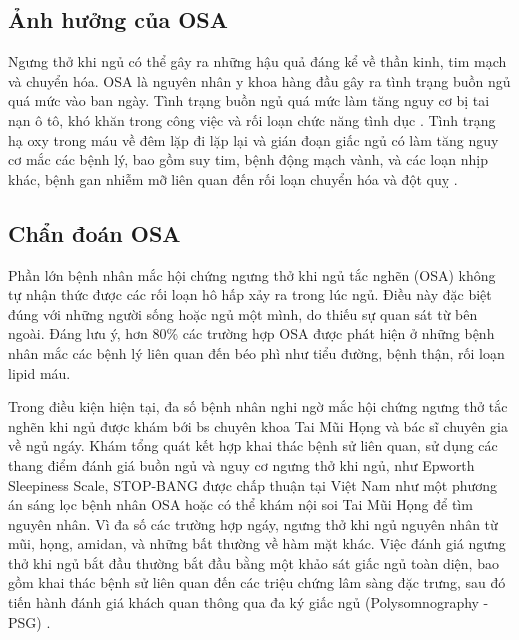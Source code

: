 \subsection{Ảnh hưởng của OSA}
Ngưng thở khi ngủ có thể gây ra những hậu quả đáng kể về thần kinh, tim mạch và
chuyển hóa. OSA là nguyên nhân y khoa hàng đầu gây ra tình trạng buồn ngủ quá
mức vào ban ngày. Tình trạng buồn ngủ quá mức làm tăng nguy cơ bị tai nạn ô tô,
khó khăn trong công việc và rối loạn chức năng tình dục
\cite{flemons1997quality}. Tình trạng hạ oxy trong máu về đêm lặp đi lặp lại và
gián đoạn giấc ngủ có làm tăng nguy cơ mắc các bệnh lý, bao gồm suy tim, bệnh
động mạch vành, và các loạn nhịp khác, bệnh gan nhiễm mỡ liên quan đến rối loạn
chuyển hóa và đột quỵ \cite{ wright1997health,Zinchuk2018,
  young1997population}.
\subsection{Chẩn đoán OSA}
Phần lớn bệnh nhân mắc hội chứng ngưng thở khi ngủ tắc nghẽn (\gls{OSA}) không
tự nhận thức được các rối loạn hô hấp xảy ra trong lúc ngủ. Điều này đặc biệt
đúng với những người sống hoặc ngủ một mình, do thiếu sự quan sát từ bên ngoài.
Đáng lưu ý, hơn 80\% các trường hợp OSA được phát hiện ở những bệnh nhân mắc
các bệnh lý liên quan đến béo phì như tiểu đường, bệnh thận, rối loạn lipid
máu.

Trong điều kiện hiện tại, đa số bệnh nhân nghi ngờ mắc hội chứng ngưng thở tắc
nghẽn khi ngủ được khám bới bs chuyên khoa Tai Mũi Họng và bác sĩ chuyên gia về
ngủ ngáy. Khám tổng quát kết hợp khai thác bệnh sử liên quan, sử dụng các thang
điểm đánh giá buồn ngủ và nguy cơ ngưng thở khi ngủ, như Epworth Sleepiness
Scale, STOP-BANG được chấp thuận tại Việt Nam như một phương án sáng lọc bệnh
nhân OSA hoặc có thể khám nội soi Tai Mũi Họng để tìm nguyên nhân. Vì đa số các
trường hợp ngáy, ngưng thở khi ngủ nguyên nhân từ mũi, họng, amidan, và những
bất thường về hàm mặt khác. Việc đánh giá ngưng thở khi ngủ bắt đầu thường bắt
đầu bằng một khảo sát giấc ngủ toàn diện, bao gồm khai thác bệnh sử liên quan
đến các triệu chứng lâm sàng đặc trưng, sau đó tiến hành đánh giá khách quan
thông qua đa ký giấc ngủ (Polysomnography - PSG)
\cite{diagnosis_osa}\cite{medical2006polysomnography}.

